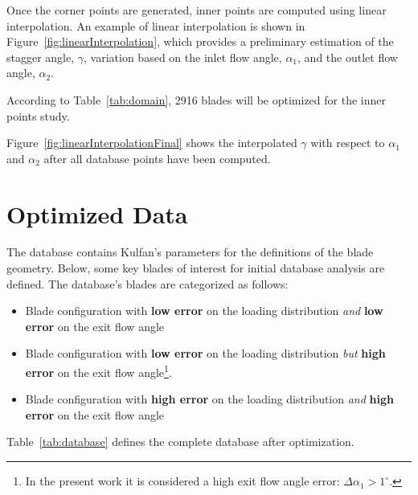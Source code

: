 Once the corner points are generated, inner points are computed using linear interpolation. An example of linear interpolation is shown in Figure~\ref{fig:linearInterpolation}, which provides a preliminary estimation of the stagger angle, $\gamma$, variation based on the inlet flow angle, $\alpha_1$, and the outlet flow angle, $\alpha_2$.

According to Table~\ref{tab:domain}, 2916 blades will be optimized for the inner points study.

Figure~\ref{fig:linearInterpolationFinal} shows the interpolated $\gamma$ with respect to $\alpha_1$ and $\alpha_2$ after all database points have been computed.

\section{Optimized Data}

The database contains Kulfan's parameters for the definitions of the blade geometry.
Below, some key blades of interest for initial database analysis are defined. The database's blades are categorized as follows:

\begin{itemize}
    \item Blade configuration with \textbf{low error} on the loading distribution \textit{and} \textbf{low error} on the exit flow angle
    \item Blade configuration with \textbf{low error} on the loading distribution \textit{but} \textbf{high error} on the exit flow angle\footnote{In the present work it is considered a high exit flow angle error: $\Delta \alpha_1 > 1^{\circ}$.}.
    \item Blade configuration with \textbf{high error} on the loading distribution \textit{and} \textbf{high error} on the exit flow angle 
\end{itemize}

Table~\ref{tab:database} defines the complete database after optimization.

